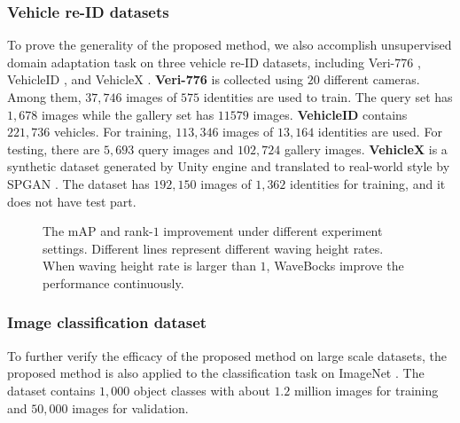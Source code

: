 \documentclass[journal]{IEEEtran}
\begin{document}
\subsubsection{Vehicle re-ID datasets}
To prove the generality of the proposed method, we also accomplish unsupervised domain adaptation task on three vehicle re-ID datasets, including Veri-776  \cite{liu2016deep}, VehicleID \cite{liu_2016deep}, and VehicleX \cite{naphade20204th}. \textbf{Veri-776} \cite{liu2016deep} is collected using $20$ different cameras. Among them, $37,746$ images of $575$ identities are used to train. The query set has $1,678$ images while the gallery set has $11579$ images. \textbf{VehicleID} \cite{liu_2016deep} contains $221,736$ vehicles. For training, $113,346$ images of $13,164$ identities are used. For testing, there are $5,693$ query images and $102,724$ gallery images. \textbf{VehicleX} \cite{naphade20204th} is a synthetic dataset generated by Unity engine \cite{yao2019simulating,tang2019pamtri} and translated to real-world style by SPGAN \cite{deng2018image}. The dataset has $192,150$ images of $1,362$ identities for training, and it does not have test part.
\begin{figure*}

\centering



 \caption{The mAP and rank-$1$ improvement under different experiment settings. Different lines represent different waving height rates. When waving height rate is larger than $1$,  WaveBocks improve the performance continuously.} \label{para}

\end{figure*}
\subsubsection{Image classification dataset}
To further verify the efficacy of the proposed method on large scale datasets, the proposed method is also applied to the classification task on ImageNet \cite{deng2009imagenet}. The dataset contains $1,000$ object classes with about $1.2$ million images for training and $50,000$ images for validation.
\end{document}
